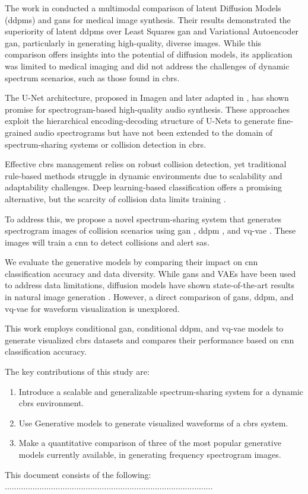 The work in \cite{9} conducted a multimodal comparison of latent Diffusion Models (\gls{ddpm}s) and \gls{gan}s for medical image synthesis. Their results demonstrated the superiority of latent \gls{ddpm}s over Least Squares \gls{gan} and Variational Autoencoder \gls{gan}, particularly in generating high-quality, diverse images. While this comparison offers insights into the potential of diffusion models, its application was limited to medical imaging and did not address the challenges of dynamic spectrum scenarios, such as those found in \gls{cbrs}.

The U-Net architecture, proposed in Imagen \cite{16} and later adapted in \cite{17}, has shown promise for spectrogram-based high-quality audio synthesis. These approaches exploit the hierarchical encoding-decoding structure of U-Nets to generate fine-grained audio spectrograms but have not been extended to the domain of spectrum-sharing systems or collision detection in \gls{cbrs}.

Effective \gls{cbrs} management relies on robust collision detection, yet traditional rule-based methods struggle in dynamic environments due to scalability and adaptability challenges. Deep learning-based classification offers a promising alternative, but the scarcity of collision data limits training \cite{5}.  

To address this, we propose a novel spectrum-sharing system that generates spectrogram images of collision scenarios using \gls{gan} \cite{6}, \gls{ddpm} \cite{7}, and \gls{vq-vae} \cite{8}. These images will train a \gls{cnn} to detect collisions and alert \gls{sas}. 

We evaluate the generative models by comparing their impact on \gls{cnn} classification accuracy and data diversity. While \gls{gan}s and VAEs have been used to address data limitations, diffusion models have shown state-of-the-art results in natural image generation \cite{9}. However, a direct comparison of \gls{gan}s, \gls{ddpm}, and \gls{vq-vae} for waveform visualization is unexplored.  

This work employs conditional \gls{gan}, conditional \gls{ddpm}, and \gls{vq-vae} models to generate visualized \gls{cbrs} datasets and compares their performance based on \gls{cnn} classification accuracy.  

The key contributions of this study are:
\begin{enumerate}
    \item Introduce a scalable and generalizable spectrum-sharing system for a dynamic \gls{cbrs} environment.
    \item Use Generative models to generate visualized waveforms of a \gls{cbrs} system.
    \item Make a quantitative comparison of three of the most popular generative models currently available, in generating frequency spectrogram images.
\end{enumerate}


This document consists of the following: ..........................................................................................

